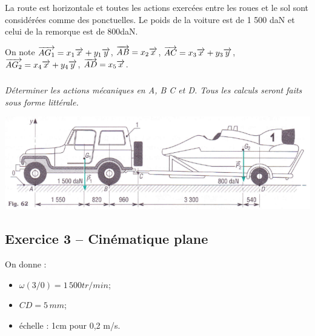 \documentclass[10pt]{article}
\begin{document}
\vspace{.5cm}

La route est horizontale et toutes les actions exercées entre les roues et le sol sont considérées comme des ponctuelles. Le poids de la voiture est de 1 500 daN et celui de la remorque est de 800daN. 


On note $\overrightarrow{AG_1}=x_1 \overrightarrow{x} + y_1 \overrightarrow{y}$, 
$\overrightarrow{AB}=x_2 \overrightarrow{x}$, 
$\overrightarrow{AC}=x_3 \overrightarrow{x} + y_3 \overrightarrow{y}$,
$\overrightarrow{AG_2}=x_4 \overrightarrow{x} + y_4 \overrightarrow{y}$,
$\overrightarrow{AD}=x_5 \overrightarrow{x}$.

\subparagraph*{}
\textit{Déterminer les actions mécaniques en A, B C et D. Tous les calculs seront faits sous forme littérale.}

\begin{center}
\includegraphics[width=\textwidth]{images/remorque}
\end{center}

\subsection*{Exercice 3 -- Cinématique plane}

On donne :
\begin{itemize}
\item $\omega(3/0) = 1\, 500 tr/min$;
\item $CD = 5\, mm$;
\item échelle : 1cm pour 0,2 m/s.
\end{itemize}
\end{document}
